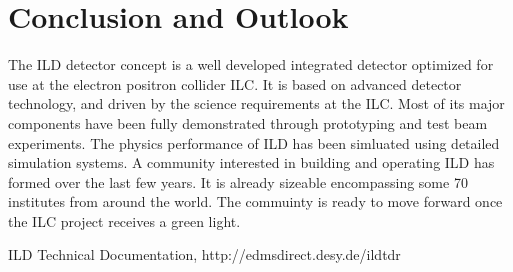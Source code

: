 \documentclass[%
 amsmath,amssymb,
 aps,
]{revtex4-1}
\begin{document}
\section{Conclusion and Outlook}
The ILD detector concept is a well developed integrated detector optimized for use at the electron positron collider ILC. It is based on advanced detector technology, and driven by the science requirements at the ILC. Most of its major components have been fully demonstrated through prototyping and test beam experiments. The physics performance of ILD has been simluated using detailed simulation systems. A community interested in building and operating ILD has formed over the last few years. It is already sizeable encompassing some 70 institutes from around the world. The commuinty is ready to move forward once the ILC project receives a green light. 

\begin{thebibliography}{}
 ILD Technical Documentation, http://edmsdirect.desy.de/ildtdr

\end{thebibliography}
\end{document}
